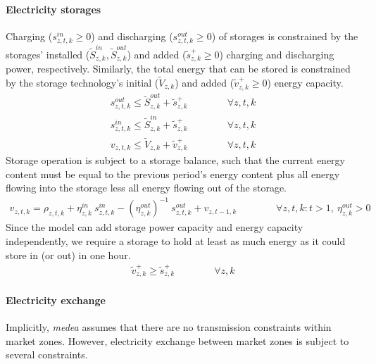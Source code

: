\documentclass[11pt,a4paper]{article}
\begin{document}
\paragraph{Electricity storages}
Charging ($s^{in}_{z,t,k} \geq 0$) and discharging ($s^{out}_{z,t,k} \geq 0$) of storages is constrained by the storages' installed ($\widetilde{S}^{in}_{z,k}, \widetilde{S}^{out}_{z,k}$) and added ($\widetilde{s}^{+}_{z,k} \geq 0$) charging and discharging power, respectively. Similarly, the total energy that can be stored is constrained by the storage technology's initial ($\widetilde{V}_{z,k}$) and added ($\widetilde{v}^{+}_{z,k} \geq 0$) energy capacity.
\begin{align}
s^{out}_{z,t,k} \leq \widetilde{S}^{out}_{z,k} + \widetilde{s}^{+}_{z,k} \qquad \qquad \forall z,t,k \\
s^{in}_{z,t,k} \leq \widetilde{S}^{in}_{z,k} + \widetilde{s}^{+}_{z,k} \qquad \qquad \forall z,t,k \\
v_{z,t,k} \leq \widetilde{V}_{z,k} + \widetilde{v}^{+}_{z,k} \qquad \qquad \forall z,t,k
\end{align}
Storage operation is subject to a storage balance, such that the current energy content must be equal to the previous period's energy content plus all energy flowing into the storage less all energy flowing out of the storage.
\begin{align}
v_{z,t,k} = \rho_{z,t,k} + \eta^{in}_{z,k} \: s^{in}_{z,t,k} - (\eta^{out}_{z,k})^{-1} \: s^{out}_{z,t,k} + v_{z,t-1,k} \qquad \qquad \forall z,t,k: t>1, \: \eta^{out}_{z,k} > 0
\end{align}
Since the model can add storage power capacity and energy capacity independently, we require a storage to hold at least as much energy as it could store in (or out) in one hour.
\begin{align}
\widetilde{v}^{+}_{z,k} \geq \widetilde{s}^{+}_{z,k} \qquad \qquad \forall z,k
\end{align}

\paragraph{Electricity exchange}
Implicitly, \emph{medea} assumes that there are no transmission constraints within market zones. 
However, electricity exchange between market zones is subject to several constraints.
\end{document}
